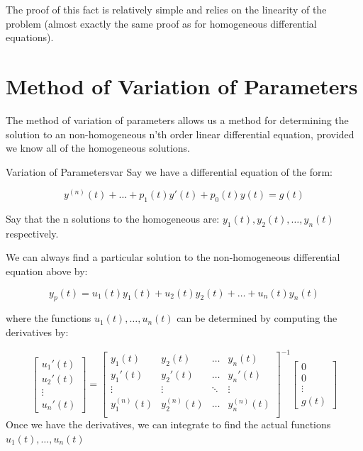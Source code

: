 \documentclass{report}
\begin{document}
The proof of this fact is relatively simple and relies on the linearity of the problem (almost exactly the same proof as for homogeneous differential equations).


\section{Method of Variation of Parameters}
The method of variation of parameters allows us a method for determining the solution to an non-homogeneous n'th order linear differential equation, provided we know all of the homogeneous solutions.

\begin{mytheo}{Variation of Parameters}{var}
    Say we have a differential equation of the form:

    $$y^{(n)}(t) + \dots + p_1(t)y'(t) + p_0(t)y(t) = g(t)$$

    Say that the n solutions to the homogeneous are:
    $y_1(t), y_2(t), \dots, y_n(t)$ respectively.
    
    We can always find a particular solution to the non-homogeneous differential equation above by:
    
    $$y_p(t) = u_1(t)y_1(t) + u_2(t)y_2(t) + \dots + u_n(t)y_n(t)$$
    
    where the functions $u_1(t), \dots, u_n(t)$ can be determined by computing the derivatives by:
    
    
$$
\begin{bmatrix}
    u_1'(t) \\
    u_2'(t) \\
    \vdots \\ 
    u_n'(t)
\end{bmatrix}
=
\begin{bmatrix}
    y_1(t) & y_2(t) & \dots  & y_n(t) \\
    y_1'(t) & y_2'(t) & \dots  & y_n'(t) \\
    \vdots & \vdots & \ddots & \vdots \\
    y_1^{(n)}(t) & y_2^{(n)}(t) & \dots  & y_n^{(n)}(t) \\
\end{bmatrix}^{-1}
\begin{bmatrix}
    0 \\
    0 \\
    \vdots \\ 
    g(t)
\end{bmatrix}
$$
Once we have the derivatives, we can integrate to find the actual functions $u_1(t), \dots, u_n(t)$
\end{mytheo}
\end{document}
